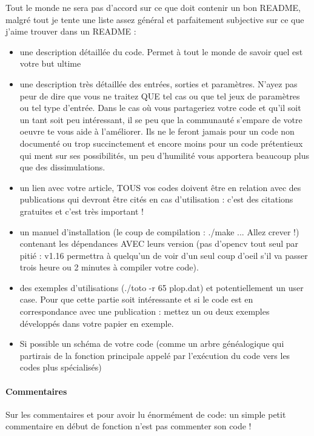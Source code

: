 Tout le monde ne sera pas d'accord sur ce que doit contenir un bon README, malgré tout je tente une
 liste assez général et parfaitement subjective sur ce que j'aime trouver dans un README : 
\begin{itemize}
\item une description détaillée du code. Permet à tout le monde de savoir quel est votre but ultime
\item une description très détaillée des entrées, sorties et paramètres. N'ayez pas peur de dire que
 vous ne traitez QUE tel cas ou que tel jeux de paramètres ou tel type d'entrée. Dans le cas où vous 
partageriez votre code et qu'il soit un tant soit peu intéressant, il se peu que la communauté s'empare 
de votre oeuvre te vous aide à l'améliorer. Ils ne le feront jamais pour un code non documenté ou trop
 succinctement et encore moins pour un code prétentieux qui ment sur ses possibilités, un peu d'humilité 
vous apportera beaucoup plus que des dissimulations.
\item un lien avec votre article, TOUS vos codes doivent être en relation avec des publications qui 
devront être cités en cas d'utilisation : c'est des citations gratuites et c'est très important ! 
\item un manuel d'installation (le coup de compilation : ./make ... Allez crever !) contenant les 
dépendances AVEC leurs version (pas d'opencv tout seul par pitié : v1.16 permettra à quelqu'un de 
voir d'un seul coup d'oeil s'il va passer trois heure ou 2 minutes à compiler votre code).
\item des exemples d'utilisations (./toto -r 65 plop.dat) et potentiellement un user case. Pour que
 cette partie soit intéressante et si le code est en correspondance avec une publication : mettez 
un ou deux exemples développés dans votre papier en exemple.
\item Si possible un schéma de votre code (comme un arbre généalogique qui partirais de la fonction
 principale appelé par l'exécution du code vers les codes plus spécialisés)
\end{itemize}

\paragraph{Commentaires}

Sur les commentaires et pour avoir lu énormément de code: un simple petit commentaire en début de 
fonction n'est pas commenter son code ! \\


